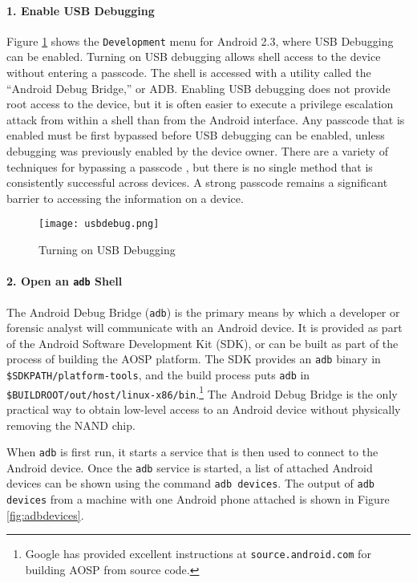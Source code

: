 \paragraph {1. 
Enable USB Debugging} Figure \ref{fig:usbdebug} shows the \texttt{Development} menu for Android 2.3, where USB Debugging can be
enabled.  Turning on USB debugging allows shell access to the device without entering a passcode. The shell is accessed with a
utility called the ``Android Debug Bridge,'' or ADB. Enabling USB debugging does not provide root access to the device, but it is
often easier to execute a privilege escalation attack from within a shell than from the Android interface. Any passcode that is
enabled must be first bypassed before USB debugging can be enabled, unless debugging was previously enabled by the device owner.
There are a variety of techniques for bypassing a passcode \cite{hoog, lockscreenbypass0, lockscreenbypass1, lockscreenbypass2}, but
there is no single method that is consistently successful across devices.  A strong passcode remains a significant barrier to
accessing the information on a device.

\begin{figure}[ht]
\caption{Turning on USB Debugging}
\begin{center}\texttt{[image: usbdebug.png]}\end{center}
\label{fig:usbdebug}
\end{figure}

\paragraph {2. Open an \texttt{adb}  Shell}

The Android Debug Bridge (\texttt{adb}) is the primary means by which a developer or forensic analyst will communicate with an
Android device. It is provided as part of the Android Software Development Kit (SDK), or can be built as part of the process of
building the AOSP platform. The SDK provides an \texttt{adb} binary in \texttt{\$SDKPATH/platform-tools}, and the build process puts
\texttt{adb} in \texttt{\$BUILDROOT/out/host/linux-x86/bin}.\footnote{Google has provided excellent instructions at
\texttt{source.android.com} for building AOSP from source code.}  The Android Debug Bridge is the only practical way to obtain
low-level access to an Android device without physically removing the NAND chip.

When \texttt{adb} is first run, it starts a service that is then used to connect to the Android device. 
Once the \texttt{adb} service is started, a list of attached Android devices can be shown using the command \texttt{adb devices}. 
The output of \texttt{adb devices} from a machine with one Android phone attached is shown in Figure \ref{fig:adbdevices}.

